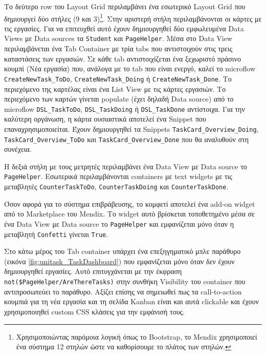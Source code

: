                 Το δεύτερο row του Layout Grid περιλαμβάνει ένα εσωτερικό Layout Grid που δημιουργεί δύο στήλες (9 και 3)\footnote{Χρησιμοποιώντας παρόμοια λογική όπως το Bootstrap, το Mendix χρησιμοποιεί ένα σύστημα 12 στηλών ώστε να καθορίσουμε το πλάτος των στηλών.}. Στην αριστερή στήλη περιλαμβάνονται οι κάρτες με τις εργασίες. Για να επιτευχθεί αυτό έχουν δημιουργηθεί δύο εμφωλευμένα Data Views με Data sources τα \texttt{Student} και \texttt{PageHelper}. Μέσα στο Data View περιλαμβάνεται ένα Tab Container με τρία tabs που αντιστοιχούν στις τρεις καταστάσεις των εργασιών. Σε κάθε tab αντιστοιχίζεται ένα ξεχωριστό πράσινο κουμπί ({\Zona Νέα εργασία}) που, ανάλογα με το tab που είναι ενεργό, καλεί το microflow \texttt{CreateNewTask\_ToDo}, \texttt{CreateNewTask\_Doing} ή \texttt{CreateNewTask\_Done}. Το περιεχόμενο της καρτέλας είναι ένα List View με τις κάρτες εργασιών. Το περιεχόμενο των καρτών γίνεται populate (έχει δηλαδή Data source) από το microflow \texttt{DSL\_TaskToDo}, \texttt{DSL\_TaskDoing} ή \texttt{DSL\_TaskDone} αντίστοιχα. Για την καλύτερη οργάνωση, η κάρτα ουσιαστικά αποτελεί ένα Snippet που επαναχρησιμοποιείται. Έχουν δημιουργηθεί τα Snippets \texttt{TaskCard\_Overview\_Doing}, \texttt{TaskCard\_Overview\_ToDo} και \texttt{TaskCard\_Overview\_Done} που θα αναλυθούν στη συνέχεια.

                Η δεξιά στήλη με τους μετρητές περιλαμβάνει ένα Data View με Data source το \texttt{PageHelper}. Εσωτερικά περιλαμβάνονται containers με text widgets με τις μεταβλητές \texttt{CounterTaskToDo}, \texttt{CounterTaskDoing} και \texttt{CounterTaskDone}.

                Όσον αφορά για το σύστημα επιβράβευσης, το κομφετί αποτελεί ένα add-on widget από το Marketplace του Mendix. Το widget αυτό βρίσκεται τοποθετημένο μέσα σε ένα Data View με Data source το \texttt{PageHelper} και εμφανίζεται μόνο όταν η μεταβλητή \texttt{Confetti} γίνεται \texttt{True}.

                Στο κάτω μέρος του Tab container υπάρχει ένα επεξηγηματικό μπλε παράθυρο (εικόνα \ref{fig:unitask_TaskDashboard}) που εμφανίζεται μόνο όταν δεν έχουν δημιουργηθεί εργασίες. Αυτό επιτυγχάνεται με την έκφραση \verb|not($PageHelper/AreThereTasks)| στην συνθήκη Visibility του container που αντιπροσωπεύει το παράθυρο. Αξίζει επίσης να σημειωθεί πως τα call-to-action κουμπιά για τη νέα εργασία και τη σελίδα Kanban είναι και αυτά clickable και έχουν χρησιμοποιηθεί custom CSS κλάσεις για την εμφάνισή τους.

